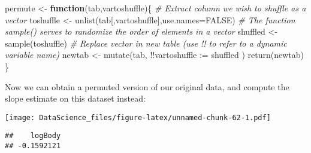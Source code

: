 \documentclass[
]{book}
\newenvironment{Shaded}{\begin{snugshade}}{\end{snugshade}}
\newcommand{\AttributeTok}[1]{\textcolor[rgb]{0.77,0.63,0.00}{#1}}
\newcommand{\CommentTok}[1]{\textcolor[rgb]{0.56,0.35,0.01}{\textit{#1}}}
\newcommand{\ConstantTok}[1]{\textcolor[rgb]{0.00,0.00,0.00}{#1}}
\newcommand{\ControlFlowTok}[1]{\textcolor[rgb]{0.13,0.29,0.53}{\textbf{#1}}}
\newcommand{\DecValTok}[1]{\textcolor[rgb]{0.00,0.00,0.81}{#1}}
\newcommand{\FunctionTok}[1]{\textcolor[rgb]{0.00,0.00,0.00}{#1}}
\newcommand{\NormalTok}[1]{#1}
\newcommand{\OtherTok}[1]{\textcolor[rgb]{0.56,0.35,0.01}{#1}}
\newcommand{\SpecialCharTok}[1]{\textcolor[rgb]{0.00,0.00,0.00}{#1}}
\newcommand{\StringTok}[1]{\textcolor[rgb]{0.31,0.60,0.02}{#1}}
\begin{document}
\begin{Shaded}
\begin{Highlighting}[]
\NormalTok{permute }\OtherTok{\textless{}{-}} \ControlFlowTok{function}\NormalTok{(tab,vartoshuffle)\{}
  \CommentTok{\# Extract column we wish to shuffle as a vector}
\NormalTok{  toshuffle }\OtherTok{\textless{}{-}} \FunctionTok{unlist}\NormalTok{(tab[,vartoshuffle],}\AttributeTok{use.names=}\ConstantTok{FALSE}\NormalTok{)}
  \CommentTok{\# The function sample() serves to randomize the order of elements in a vector}
\NormalTok{  shuffled }\OtherTok{\textless{}{-}} \FunctionTok{sample}\NormalTok{(toshuffle)}
  \CommentTok{\# Replace vector in new table (use !! to refer to a dynamic variable name)}
\NormalTok{  newtab }\OtherTok{\textless{}{-}} \FunctionTok{mutate}\NormalTok{(tab, }\SpecialCharTok{!!}\AttributeTok{vartoshuffle :=}\NormalTok{ shuffled )}
  \FunctionTok{return}\NormalTok{(newtab)}
\NormalTok{\}}
\end{Highlighting}
\end{Shaded}

Now we can obtain a permuted version of our original data, and compute the slope estimate on this dataset instead:

\begin{Shaded}
\end{Shaded}

\texttt{[image: DataScience\_files/figure-latex/unnamed-chunk-62-1.pdf]}

\begin{Shaded}
\end{Shaded}

\begin{verbatim}
##    logBody 
## -0.1592121
\end{verbatim}
\end{document}
